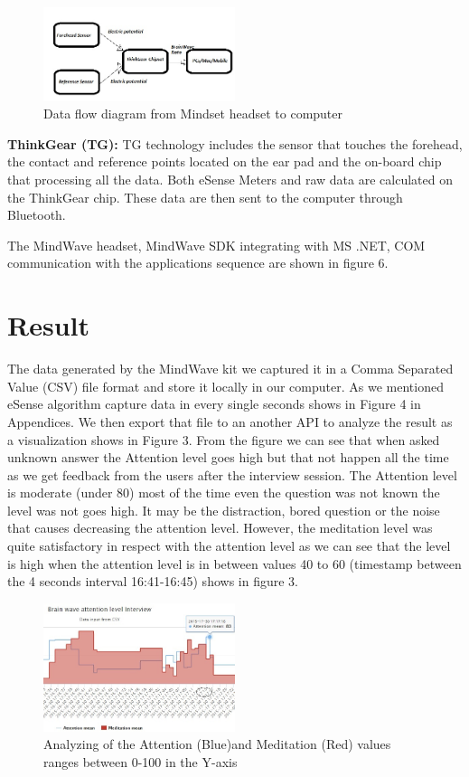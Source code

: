 \documentclass{bioinfo}
\begin{document}
\begin{figure}[ht!]
\includegraphics[width=0.5\textwidth]{Data_Flow_Mindset_Computer.jpg}
\caption{Data flow diagram from Mindset headset to computer}
\end{figure}


\textbf{ThinkGear (TG):} TG technology includes the sensor that touches the forehead, the contact and reference points located on the ear pad and the on-board chip that processing all the data. Both eSense Meters and raw data are
calculated on the ThinkGear chip. These data are then sent to the computer
through Bluetooth.

The MindWave headset, MindWave SDK integrating with MS .NET, COM communication with the applications sequence are shown in figure 6.




\section{Result}
The data generated by the MindWave kit we captured it in a Comma Separated Value (CSV) file format and store it locally in our computer. As we mentioned eSense algorithm capture data in every single seconds shows in Figure 4 in Appendices. We then export that file to an another API to analyze the result as a visualization shows in Figure 3. From the figure we can see that when asked unknown answer the Attention level goes high but that not happen all the time as we get feedback from the users after the interview session. The Attention level is moderate (under 80) most of the time even the question was not known the level was not goes high. It may be the distraction, bored question or the noise that causes decreasing the attention level. However, the meditation level was quite satisfactory in respect with the attention level as we can see that the level is high when the attention level is in between values  40 to 60 (timestamp between the 4 seconds interval 16:41-16:45) shows in figure 3.

\begin{figure}[ht!]
\includegraphics[width=0.5\textwidth]{AttentionLevelWith_Meditation.jpg}
\caption{Analyzing of the Attention (Blue)and Meditation (Red) values ranges between 0-100 in the Y-axis}
\end{figure}
\end{document}
